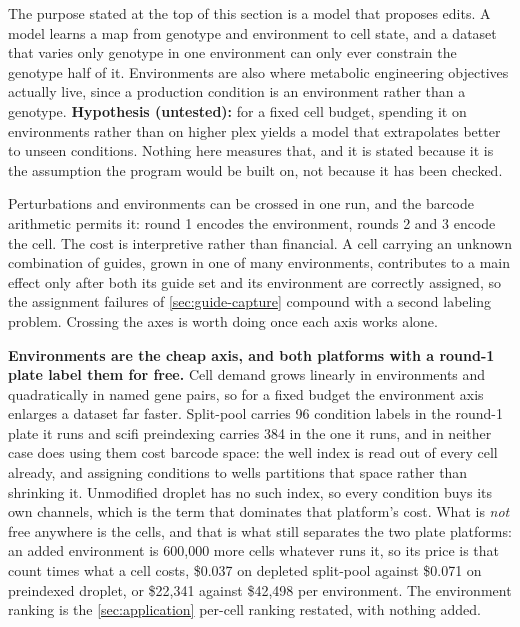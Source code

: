  The purpose stated
at the top of this section is a model that proposes edits. A model learns a map
from genotype and environment to cell state, and a dataset that varies only
genotype in one environment can only ever constrain the genotype half of it.
Environments are also where metabolic engineering objectives actually live, since
a production condition is an environment rather than a genotype.
\textbf{Hypothesis (untested):} for a fixed cell budget, spending it on
environments rather than on higher plex yields a model that extrapolates better
to unseen conditions. Nothing here measures that, and it is stated because it is
the assumption the program would be built on, not because it has been checked.

 Perturbations and environments can be crossed in one
run, and the barcode arithmetic permits it: round 1 encodes the environment,
rounds 2 and 3 encode the cell. The cost is interpretive rather than financial.
A cell carrying an unknown combination of guides, grown in one of many
environments, contributes to a main effect only after both its guide set and its
environment are correctly assigned, so the assignment failures of
\cref{sec:guide-capture} compound with a second labeling problem. Crossing the
axes is worth doing once each axis works alone.

\begin{keybox}
\textbf{Environments are the cheap axis, and both platforms with a round-1 plate
label them for free.} Cell demand grows linearly in environments and
quadratically in named gene pairs, so for a fixed budget the environment axis
enlarges a dataset far faster. Split-pool carries 96 condition labels in the
round-1 plate it runs and scifi preindexing carries 384 in the one it runs, and
in neither case does using them cost barcode space: the well index is read out of
every cell already, and assigning conditions to wells partitions that space
rather than shrinking it. Unmodified droplet has no such index, so every condition buys its
own channels, which is the term that dominates that platform's cost. What is
\emph{not} free anywhere is the cells, and that is what still separates the two
plate platforms: an added environment is 600{,}000 more cells whatever runs it,
so its price is that count times what a cell costs, \$0.037 on depleted
split-pool against \$0.071 on preindexed droplet, or \$22{,}341 against
\$42{,}498 per environment. The environment ranking is the \cref{sec:application}
per-cell ranking restated, with nothing added.
\end{keybox}

